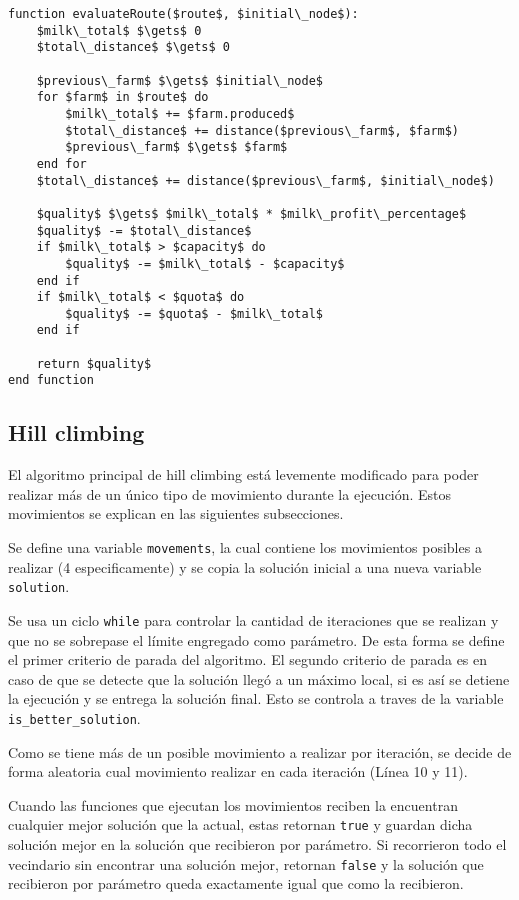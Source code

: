 \begin{lstlisting}[style=estiloPseudocodigo]
function evaluateRoute($route$, $initial\_node$):
    $milk\_total$ $\gets$ 0
    $total\_distance$ $\gets$ 0

    $previous\_farm$ $\gets$ $initial\_node$
    for $farm$ in $route$ do
        $milk\_total$ += $farm.produced$
        $total\_distance$ += distance($previous\_farm$, $farm$)
        $previous\_farm$ $\gets$ $farm$
    end for
    $total\_distance$ += distance($previous\_farm$, $initial\_node$)

    $quality$ $\gets$ $milk\_total$ * $milk\_profit\_percentage$
    $quality$ -= $total\_distance$
    if $milk\_total$ > $capacity$ do
        $quality$ -= $milk\_total$ - $capacity$
    end if
    if $milk\_total$ < $quota$ do
        $quality$ -= $quota$ - $milk\_total$
    end if

    return $quality$
end function
\end{lstlisting}

\subsection{Hill climbing}

El algoritmo principal de hill climbing está levemente modificado para poder realizar más de un único tipo de movimiento durante la ejecución. Estos movimientos se explican en las siguientes subsecciones.

Se define una variable \texttt{movements}, la cual contiene los movimientos posibles a realizar (4 especificamente) y se copia la solución inicial a una nueva variable \texttt{solution}.

Se usa un ciclo \texttt{while} para controlar la cantidad de iteraciones que se realizan y que no se sobrepase el límite engregado como parámetro. De esta forma se define el primer criterio de parada del algoritmo. El segundo criterio de parada es en caso de que se detecte que la solución llegó a un máximo local, si es así se detiene la ejecución y se entrega la solución final. Esto se controla a traves de la variable \texttt{is\_better\_solution}.

Como se tiene más de un posible movimiento a realizar por iteración, se decide de forma aleatoria cual movimiento realizar en cada iteración (Línea 10 y 11).

Cuando las funciones que ejecutan los movimientos reciben la encuentran cualquier mejor solución que la actual, estas retornan \texttt{true} y guardan dicha solución mejor en la solución que recibieron por parámetro. Si recorrieron todo el vecindario sin encontrar una solución mejor, retornan \texttt{false} y la solución que recibieron por parámetro queda exactamente igual que como la recibieron.

